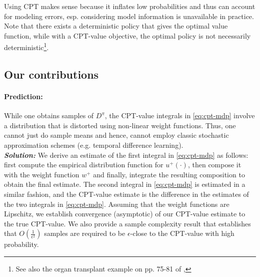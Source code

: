 \documentclass[11pt,letterpaper,english]{article}
\begin{document}
Using CPT makes sense because it inflates low probabilities and thus can account for modeling errors, esp. considering model information is unavailable in practice.
Note that there exists a deterministic policy that gives the optimal value function, while with a CPT-value objective, the optimal policy is not necessarily deterministic\footnote{See also the organ transplant example on pp. 75-81 of \cite{lin2013stochastic},}. 


\subsection{Our contributions}
\paragraph{Prediction:} While one obtains samples of $D^\pi$, the CPT-value integrals in \eqref{eq:cpt-mdp} involve a distribution that is distorted using non-linear weight functions. Thus, one cannot just do sample means and hence, cannot employ classic stochastic approximation schemes (e.g. temporal difference learning). \\
\textit{\textbf{Solution:}} 
We derive an estimate of the first integral in \eqref{eq:cpt-mdp} as follows:
first compute the empirical distribution function for $u^+(\cdot)$, then compose it with the weight function $w^+$ and finally, integrate the resulting composition to obtain the final estimate. The second integral in \eqref{eq:cpt-mdp} is estimated in a similar fashion, and the CPT-value estimate is the difference in the estimates of the two integrals in \eqref{eq:cpt-mdp}.
Assuming that the weight functions are Lipschitz,  we establish convergence (asymptotic) of our CPT-value estimate to the true CPT-value. We also provide a sample complexity result that establishes that  $O\left(\frac1{\epsilon^2}\right)$ samples are required to be $\epsilon$-close to the CPT-value with high probability. 
\end{document}
